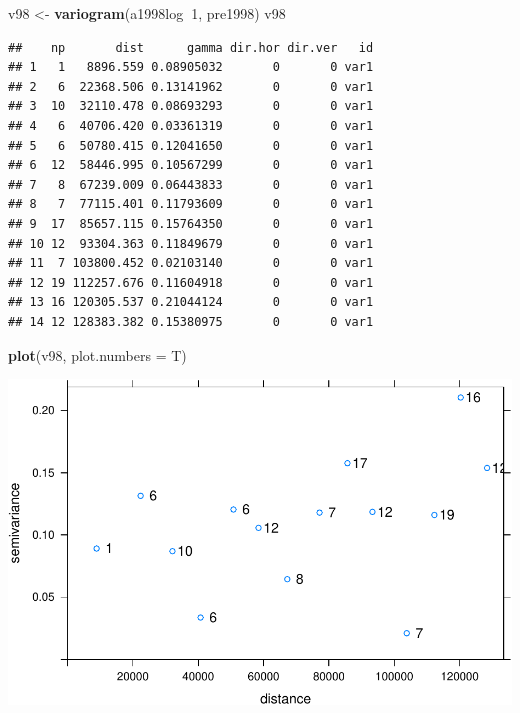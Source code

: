 \documentclass[11pt,]{article}
\newenvironment{Shaded}{\begin{snugshade}}{\end{snugshade}}
\newcommand{\KeywordTok}[1]{\textcolor[rgb]{0.13,0.29,0.53}{\textbf{#1}}}
\newcommand{\DataTypeTok}[1]{\textcolor[rgb]{0.13,0.29,0.53}{#1}}
\newcommand{\DecValTok}[1]{\textcolor[rgb]{0.00,0.00,0.81}{#1}}
\newcommand{\StringTok}[1]{\textcolor[rgb]{0.31,0.60,0.02}{#1}}
\newcommand{\OperatorTok}[1]{\textcolor[rgb]{0.81,0.36,0.00}{\textbf{#1}}}
\newcommand{\NormalTok}[1]{#1}
\begin{document}
\begin{Shaded}
\begin{Highlighting}[]
\NormalTok{v98 <-}\StringTok{ }\KeywordTok{variogram}\NormalTok{(a1998log}\OperatorTok{~}\DecValTok{1}\NormalTok{, pre1998)}
\NormalTok{v98}
\end{Highlighting}
\end{Shaded}

\begin{verbatim}
##    np       dist      gamma dir.hor dir.ver   id
## 1   1   8896.559 0.08905032       0       0 var1
## 2   6  22368.506 0.13141962       0       0 var1
## 3  10  32110.478 0.08693293       0       0 var1
## 4   6  40706.420 0.03361319       0       0 var1
## 5   6  50780.415 0.12041650       0       0 var1
## 6  12  58446.995 0.10567299       0       0 var1
## 7   8  67239.009 0.06443833       0       0 var1
## 8   7  77115.401 0.11793609       0       0 var1
## 9  17  85657.115 0.15764350       0       0 var1
## 10 12  93304.363 0.11849679       0       0 var1
## 11  7 103800.452 0.02103140       0       0 var1
## 12 19 112257.676 0.11604918       0       0 var1
## 13 16 120305.537 0.21044124       0       0 var1
## 14 12 128383.382 0.15380975       0       0 var1
\end{verbatim}

\begin{Shaded}
\begin{Highlighting}[]
\KeywordTok{plot}\NormalTok{(v98, }\DataTypeTok{plot.numbers =}\NormalTok{ T)}
\end{Highlighting}
\end{Shaded}

\includegraphics[width=800px]{proyecto_files/figure-latex/vgm-pre1979-1}
\end{document}
